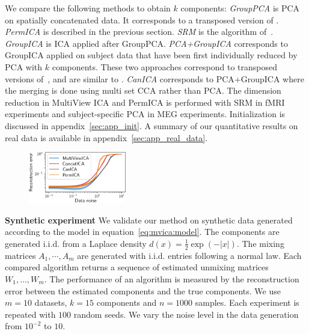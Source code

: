 \documentclass{report}
\begin{document}
We compare the following methods to obtain $k$ components:
%
\emph{GroupPCA} is PCA on spatially concatenated data. It corresponds to a transposed version of \cite{smith2014group}.
%
\emph{PermICA} is described in the previous section.
%
\emph{SRM} is  the algorithm of~\cite{chen2015reduced}.
%
\emph{GroupICA} is ICA applied after GroupPCA.
%
\emph{PCA+GroupICA} corresponds to GroupICA applied on subject data that have been first individually reduced by PCA with $k$ components. 
%
These two approaches correspond to transposed versions of~\cite{calhoun2001fmri}, and are similar to \cite{eichele2011eegift}.
\emph{CanICA} corresponds to PCA+GroupICA where the merging is done using multi set CCA rather than PCA. The dimension reduction in MultiView ICA and PermICA is performed with SRM in fMRI experiments and subject-specific PCA in MEG experiments. Initialization is discussed in appendix~\ref{sec:app_init}. A summary of our quantitative results on real data is available in appendix~\ref{sec:app_real_data}.

\begin{figure}
\label{fig:synth}
\includegraphics[width=0.38\textwidth]{figures/mvica/distance_expe.pdf}
\end{figure}

\textbf{Synthetic experiment}
We validate our method on synthetic data generated according to the model in equation~\eqref{eq:mvica:model}.
%
The components are generated i.i.d. from a Laplace density $d(x)=\frac12\exp(-|x|)$.
%
The mixing matrices $A_1,\cdots, A_m$ are generated with i.i.d. entries following a normal law.
Each compared algorithm returns a sequence of estimated unmixing matrices $W_1, \dots, W_m$.
%
The performance of an algorithm is measured by the reconstruction error between the estimated components and the true components.
%
%
We use $m=10$ datasets, $k=15$ components and $n=1000$ samples. Each experiment is repeated with $100$ random seeds.
%
We vary the noise level in the data generation from $10^{-2}$ to $10$.
\end{document}
